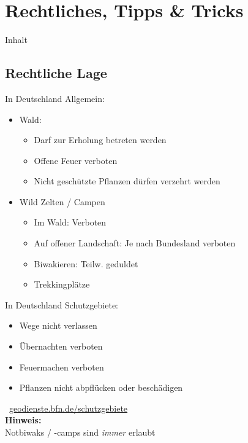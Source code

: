 \documentclass[aspectratio=169]{beamer}
\newcommand{\tipp}[2][Tipp]{\vspace{0.2cm}\textbf{#1:}\\#2}
\begin{document}
	\section{Rechtliches, Tipps \& Tricks}
		
		\begin{frame}[t]{Inhalt}
		\end{frame}
	
		\subsection{Rechtliche Lage}
			
			\begin{frame}{In Deutschland}
				Allgemein:
				\begin{itemize}
					\item Wald:
					\begin{itemize}
						\item Darf zur Erholung betreten werden
						\item Offene Feuer verboten
						\item Nicht geschützte Pflanzen dürfen verzehrt werden
					\end{itemize}
					\item Wild Zelten / Campen
					\begin{itemize}
						\item Im Wald: Verboten
						\item Auf offener Landschaft: Je nach Bundesland verboten
						\item Biwakieren: Teilw. geduldet
						\item[\textrightarrow] Trekkingplätze
					\end{itemize}
				\end{itemize}
			\end{frame}
			
			\begin{frame}{In Deutschland}
				Schutzgebiete:
				\begin{itemize}
					\item Wege nicht verlassen
					\item Übernachten verboten
					\item Feuermachen verboten
					\item Pflanzen nicht abpflücken oder beschädigen
				\end{itemize}
				\vspace{0.2cm}
				\textcolor{blue}{\textrightarrow}\ \href{https://geodienste.bfn.de/schutzgebiete}{geodienste.bfn.de/schutzgebiete}\\
				\pause
				\vspace{0.2cm}
				\tipp[Hinweis]{Notbiwaks / -camps sind \textit{immer} erlaubt}
			\end{frame}
			
\end{document}
